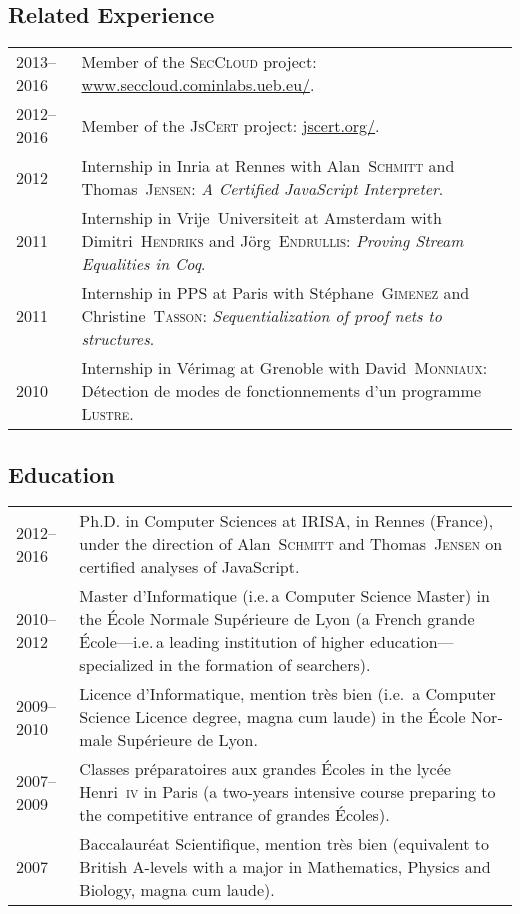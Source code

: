 \documentclass[12pt,a4paper]{article}
\makeatletter
\newcommand{\fr}[1]{\foreignlanguage{french}{{#1}}}
\newcommand{\fr}[1]{\foreignlanguage{francais}{{#1}}}
\newcommand{\ie}{i.e.\,}
\newenvironment{datecvsection}[1]%
               {\subsection*{#1}%
                 \noindent \begin{tabular}{@{}p{\annee}p{\texte}@{}}}
               {\end{tabular}}
\newcommand\familyName{\textsc}
\newcommand\placeName{}
\makeatother
\begin{document}
\begin{datecvsection}{Related Experience}

	2013–2016 & Member of the \textsc{SecCloud} project:  \url{www.seccloud.cominlabs.ueb.eu/}. \\

	2012–2016 & Member of the \textsc{JsCert} project:  \url{jscert.org/}. \\

	2012 & Internship in \placeName{Inria} at \placeName{Rennes} with Alan~\familyName{Schmitt} and Thomas~\familyName{Jensen}:
	\textit{A Certified JavaScript Interpreter}. \\

	2011 & Internship in \placeName{Vrĳe~Universiteit} at \placeName{Amsterdam} with Dimitri~\familyName{Hendriks} and Jörg~\familyName{Endrullis}:
	\textit{Proving Stream Equalities in Coq}. \\

    2011 & Internship in \fr{\placeName{PPS}} at \placeName{Paris} with Stéphane~\familyName{Gimenez} and Christine~\familyName{Tasson}:
	\textit{Sequentialization of proof nets to structures}. \\

    2010 & Internship in \fr{\placeName{Vérimag}} at \placeName{Grenoble} with David~\familyName{Monniaux}:
        \fr{Détection de modes de fonctionnements d’un programme \textsc{Lustre}}. \\

\end{datecvsection}

\begin{datecvsection}{Education}

    2012–2016 & Ph.D. in Computer Sciences at \placeName{IRISA}, in \placeName{Rennes} (\placeName{France}), under the direction of Alan~\familyName{Schmitt} and Thomas~\familyName{Jensen} on certified analyses of JavaScript. \\

	2010–2012 & \fr{Master d’Informatique} (\ie a Computer Science
    Master) in the \fr{\placeName{École Normale Supérieure de Lyon}} (a French
	\fr{grande École}—\ie a leading institution of higher
    education—specialized in the formation of searchers). \\

	2009–2010 & \fr{Licence d’Informatique, mention très bien} (\ie
	a Computer Science Licence degree, magna cum laude) in the
    \fr{\placeName{École Normale Supérieure de Lyon}}. \\

	2007–2009 & \fr{Classes préparatoires aux grandes Écoles} in the
    \fr{\placeName{lycée Henri~\textsc{iv}}} in Paris (a two-years intensive course
	preparing to the competitive entrance of \fr{grandes Écoles}). \\

	2007 & \fr{Baccalauréat Scientifique, mention très bien}
	(equivalent to British A-levels with a major in Mathematics, Physics
	and Biology, magna cum laude). \\

\end{datecvsection}
\end{document}
